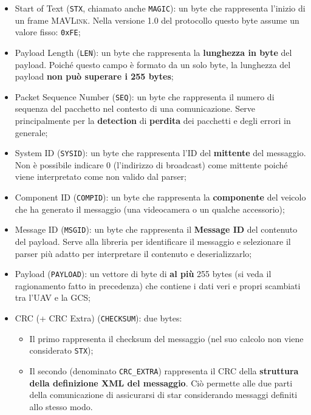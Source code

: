 \documentclass[a4paper, 12pt, oneside]{article}
\theoremstyle{definition}
\begin{document}
\begin{itemize}
    \item Start of Text (\texttt{STX}, chiamato anche \texttt{MAGIC}): un byte che rappresenta l'inizio di un frame \textsc{MAVLink}. Nella versione 1.0 del protocollo questo byte assume un valore fisso: \texttt{0xFE};
    \item Payload Length (\texttt{LEN}): un byte che rappresenta la \textbf{lunghezza in byte} del payload. Poiché questo campo è formato da un solo byte, la lunghezza del payload \textbf{non può superare i 255 bytes};
    \item Packet Sequence Number (\texttt{SEQ}): un byte che rappresenta il numero di sequenza del pacchetto nel contesto di una comunicazione. Serve principalmente per la \textbf{detection} di \textbf{perdita} dei pacchetti e degli errori in generale;
    \item System ID (\texttt{SYSID}): un byte che rappresenta l'ID del \textbf{mittente} del messaggio. Non è possibile indicare 0 (l'indirizzo di broadcast) come mittente poiché viene interpretato come non valido dal parser;
    \item Component ID (\texttt{COMPID}): un byte che rappresenta la \textbf{componente} del veicolo che ha generato il messaggio (una videocamera o un qualche accessorio);
    \item Message ID (\texttt{MSGID}): un byte che rappresenta il \textbf{Message ID} del contenuto del payload. Serve alla libreria per identificare il messaggio e selezionare il parser più adatto per interpretare il contenuto e deserializzarlo;
    \item Payload (\texttt{PAYLOAD}): un vettore di byte di \textbf{al più} 255 bytes (si veda il ragionamento fatto in precedenza) che contiene i dati veri e propri scambiati tra l'UAV e la GCS;
    \item CRC (+ CRC Extra) (\texttt{CHECKSUM}): due bytes: \begin{itemize}
        \item Il primo rappresenta il checksum del messaggio (nel suo calcolo non viene considerato \texttt{STX});
        \item Il secondo (denominato \texttt{CRC\_EXTRA}) rappresenta il CRC della \textbf{struttura della definizione XML del messaggio}. Ciò permette alle due parti della comunicazione di assicurarsi di star considerando messaggi definiti allo stesso modo.
    \end{itemize}
\end{itemize}
\end{document}
